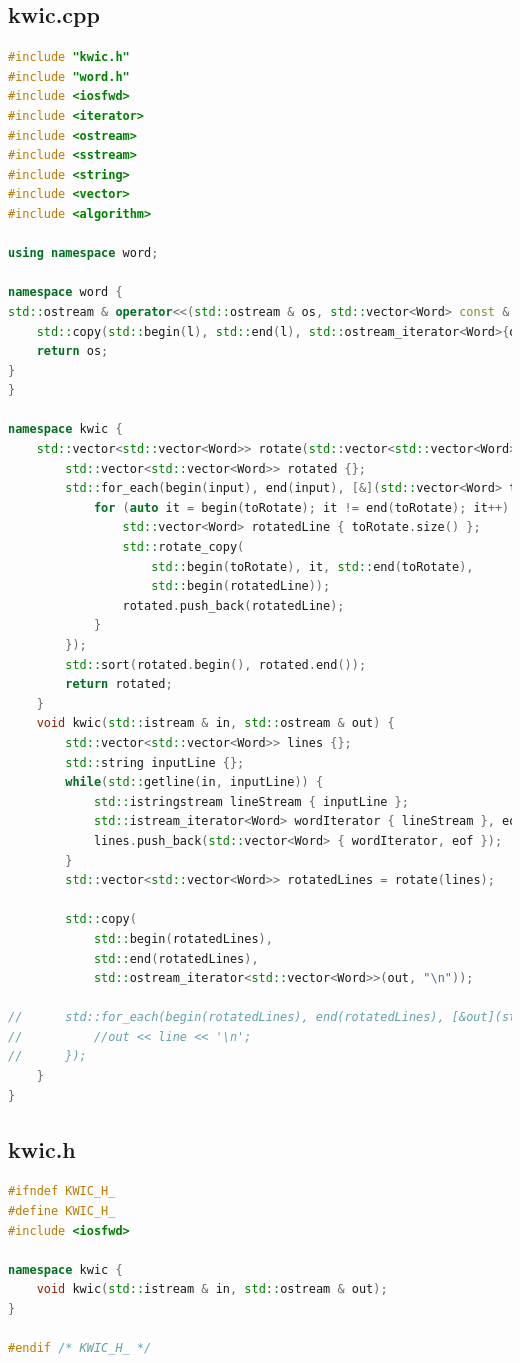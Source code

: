 \subsection{kwic.cpp}
\begin{lstlisting}[language=C++]
#include "kwic.h"
#include "word.h"
#include <iosfwd>
#include <iterator>
#include <ostream>
#include <sstream>
#include <string>
#include <vector>
#include <algorithm>

using namespace word;

namespace word {
std::ostream & operator<<(std::ostream & os, std::vector<Word> const & l) {
	std::copy(std::begin(l), std::end(l), std::ostream_iterator<Word>{os, " "});
	return os;
}
}

namespace kwic {
	std::vector<std::vector<Word>> rotate(std::vector<std::vector<Word>> const & input) {
		std::vector<std::vector<Word>> rotated {};
		std::for_each(begin(input), end(input), [&](std::vector<Word> toRotate) {
			for (auto it = begin(toRotate); it != end(toRotate); it++) {
				std::vector<Word> rotatedLine { toRotate.size() };
				std::rotate_copy(
					std::begin(toRotate), it, std::end(toRotate),
					std::begin(rotatedLine));
				rotated.push_back(rotatedLine);
			}
		});
		std::sort(rotated.begin(), rotated.end());
		return rotated;
	}
	void kwic(std::istream & in, std::ostream & out) {
		std::vector<std::vector<Word>> lines {};
		std::string inputLine {};
		while(std::getline(in, inputLine)) {
			std::istringstream lineStream { inputLine };
			std::istream_iterator<Word> wordIterator { lineStream }, eof {};
			lines.push_back(std::vector<Word> { wordIterator, eof });
		}
		std::vector<std::vector<Word>> rotatedLines = rotate(lines);

		std::copy(
			std::begin(rotatedLines),
			std::end(rotatedLines),
			std::ostream_iterator<std::vector<Word>>(out, "\n"));

//		std::for_each(begin(rotatedLines), end(rotatedLines), [&out](std::vector<Word> line) {
//			//out << line << '\n';
//		});
	}
}
\end{lstlisting}
\subsection{kwic.h}
\begin{lstlisting}[language=C++]
#ifndef KWIC_H_
#define KWIC_H_
#include <iosfwd>

namespace kwic {
	void kwic(std::istream & in, std::ostream & out);
}

#endif /* KWIC_H_ */
\end{lstlisting}
